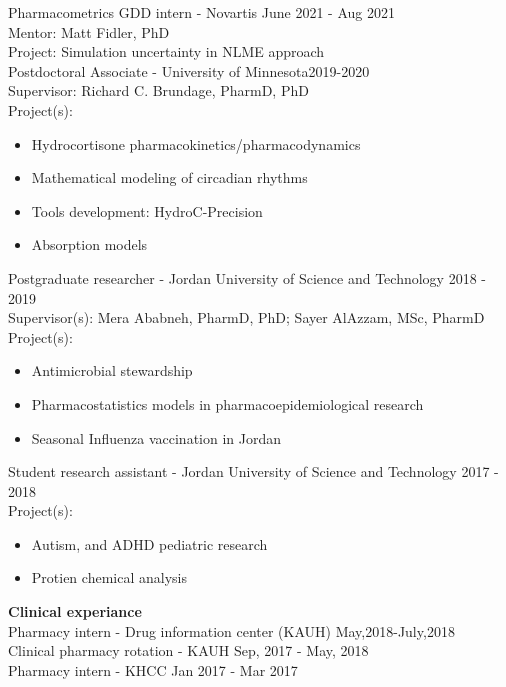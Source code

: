 \documentclass[a4paper,11pt]{article}
\begin{document}
Pharmacometrics GDD intern - Novartis \hfill June 2021 - Aug 2021\\
Mentor: Matt Fidler, PhD \\
Project: Simulation uncertainty in NLME approach \\

Postdoctoral Associate - University of Minnesota\hfill 2019-2020\\
Supervisor: Richard C. Brundage, PharmD, PhD\\
Project(s):\\ 
\begin{itemize}
\item Hydrocortisone pharmacokinetics/pharmacodynamics 
\item Mathematical modeling of circadian rhythms 
\item Tools development: HydroC-Precision 
\item Absorption models
\end{itemize}

Postgraduate researcher - Jordan University of Science and Technology \hfill 2018 - 2019\\ 
Supervisor(s): Mera Ababneh, PharmD, PhD; Sayer AlAzzam, MSc, PharmD \\
Project(s): 
\begin{itemize}
\item Antimicrobial stewardship 
\item Pharmacostatistics models in pharmacoepidemiological research 
\item Seasonal Influenza vaccination in Jordan
\end{itemize}

Student research assistant - Jordan University of Science and Technology \hfill 2017 - 2018\\
Project(s): 
\begin{itemize}
\item Autism, and ADHD pediatric research 
\item Protien chemical analysis
\end{itemize} 

\textbf{Clinical experiance}\\

Pharmacy intern - Drug information center (KAUH) \hfill May,2018-July,2018 \\

Clinical pharmacy rotation - KAUH \hfill Sep, 2017 - May, 2018 \\

Pharmacy intern - KHCC \hfill Jan 2017 - Mar 2017 \\
\end{document}
